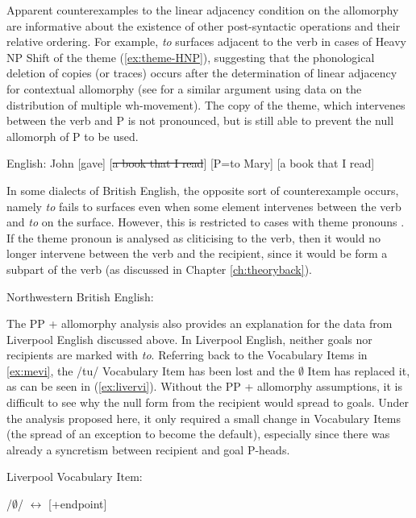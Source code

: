 	Apparent counterexamples to the linear adjacency condition on the allomorphy are informative about the existence of other post-syntactic operations and their relative ordering. For example, \textit{to} surfaces adjacent to the verb in cases of Heavy NP Shift of the theme (\ref{ex:theme-HNP}), suggesting that the phonological deletion of copies (or traces) occurs after the determination of linear adjacency for contextual allomorphy (see \citet{Franks} for a similar argument using data on the distribution of multiple wh-movement). The copy of the theme, which intervenes between the verb and P is not pronounced, but is still able to prevent the null allomorph of P to be used.
	\begin{exe}
		\ex \label{ex:theme-HNP} English: John [gave] [\sout{a book that I read}] [P=to Mary] [a book that I read]
	\end{exe}
	In some dialects of British English, the opposite sort of counterexample occurs, namely \textit{to} fails to surfaces even when some element intervenes between the verb and \textit{to} on the surface. However, this is restricted to cases with theme pronouns \citep{Biggs.2015}. If the theme pronoun is analysed as cliticising to the verb, then it would no longer intervene between the verb and the recipient, since it would be form a subpart of the verb (as discussed in Chapter \ref{ch:theoryback}).
	\begin{exe}
		\ex Northwestern British English:\label{ex:nw-brit-P}
		\begin{xlist}
		\ex[ ]{John [gave=it] [P=$\emptyset$ Mary]}
		\ex[*]{John [gave] [the book] [P=$\emptyset$ Mary]}
	\end{xlist}
	\end{exe}
	The PP + allomorphy analysis also provides an explanation for the data from Liverpool English discussed above. In Liverpool English, neither goals nor recipients are marked with \textit{to}. Referring back to the Vocabulary Items in \ref{ex:mevi}, the /tu/ Vocabulary Item has been lost and the $\emptyset$ Item has replaced it, as can be seen in (\ref{ex:livervi}). Without the PP + allomorphy assumptions, it is difficult to see why the null form from the recipient would spread to goals. Under the analysis proposed here, it only required a small change in Vocabulary Items (the spread of an exception to become the default), especially since there was already a syncretism between recipient and goal P-heads.

	\begin{exe}
		\ex Liverpool Vocabulary Item: \label{ex:livervi}
		\begin{xlist}
			\ex /$\emptyset$/ $\leftrightarrow$ [+endpoint]
		\end{xlist}
	\end{exe}


